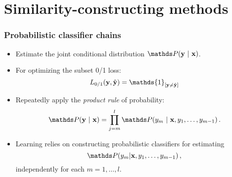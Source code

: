 \documentclass[11pt,compress,t,notes=noshow, xcolor=table]{beamer}
\begin{document}
\section{Similarity-constructing methods}




\begin{frame}
	\frametitle{Probabilistic classifier chains}
	
	\begin{itemize}
		\item Estimate the \alert{joint} conditional distribution $\P(\yv ~|~  \xv)$. 
		\item For optimizing the \alert{subset 0/1} loss:  $$ L_{0/1}(\yv, \hat{\yv}) = \mathds{1}_{[\yv \ne \hat{\yv}]}$$
		\item Repeatedly apply the \emph{product rule} of probability:
		$$
		\P(\yv ~|~ \xv) = \prod_{j=m}^{l} \P(y_m ~|~ \xv, y_1, \ldots,y_{m-1}) \, .
		$$
		\item  Learning relies on constructing \alert{probabilistic classifiers} for estimating 
		$$
		\P( y_m|\xv, y_1, \ldots,y_{m-1}) \,,
		$$
		{independently} for each $m = 1, \ldots, l$. 
	\end{itemize}
\end{frame}
\end{document}
